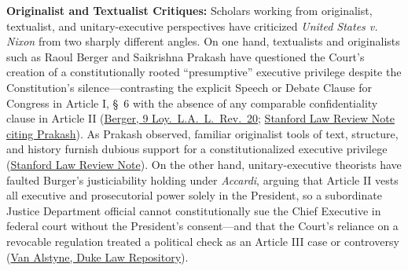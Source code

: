 \documentclass[12pt]{article}
\begin{document}
\textbf{Originalist and Textualist Critiques:} Scholars working from originalist, textualist, and unitary-executive perspectives have criticized \textit{United States v. Nixon} from two sharply different angles. On one hand, textualists and originalists such as Raoul Berger and Saikrishna Prakash have questioned the Court's creation of a constitutionally rooted ``presumptive'' executive privilege despite the Constitution's silence---contrasting the explicit Speech or Debate Clause for Congress in Article I, \S\ 6 with the absence of any comparable confidentiality clause in Article II (\href{https://digitalcommons.lmu.edu/llr/vol9/iss1/5/}{Berger, 9 Loy.\ L.A.\ L.\ Rev.\ 20}; \href{https://law.stanford.edu/wp-content/uploads/2018/03/magid.pdf}{Stanford Law Review Note citing Prakash}). As Prakash observed, familiar originalist tools of text, structure, and history furnish dubious support for a constitutionalized executive privilege (\href{https://law.stanford.edu/wp-content/uploads/2018/03/magid.pdf}{Stanford Law Review Note}). On the other hand, unitary-executive theorists have faulted Burger's justiciability holding under \textit{Accardi}, arguing that Article II vests all executive and prosecutorial power solely in the President, so a subordinate Justice Department official cannot constitutionally sue the Chief Executive in federal court without the President's consent---and that the Court's reliance on a revocable regulation treated a political check as an Article III case or controversy (\href{https://scholarship.law.duke.edu/cgi/viewcontent.cgi?article=5789&context=faculty_scholarship}{Van Alstyne, Duke Law Repository}).
\end{document}
